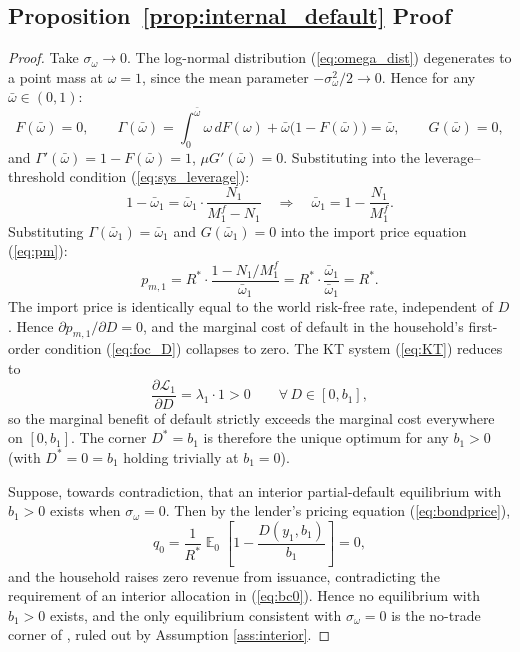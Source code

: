\documentclass[11pt]{article}
\DeclareMathOperator{\E}{\mathbb{E}}
\theoremstyle{definition}
\theoremstyle{plain}
\theoremstyle{remark}
\newcommand{\Mf}{M^{f}}
\newcommand{\Rstar}{R^{*}}
\begin{document}
\begin{appendices}
\section{Proposition~\ref{prop:internal_default} Proof} \label{ap:internal_default_proof}

\begin{proof}
Take $\sigma_\omega \to 0$. The log-normal distribution (\ref{eq:omega_dist}) degenerates to a point mass at $\omega = 1$, since the mean parameter $-\sigma_\omega^2/2 \to 0$. Hence for any $\bar\omega \in (0, 1)$:
\begin{equation*}
    F(\bar\omega) = 0, \qquad \Gamma(\bar\omega) = \int_0^{\bar\omega} \omega \, dF(\omega) + \bar\omega\bigl(1 - F(\bar\omega)\bigr) = \bar\omega, \qquad G(\bar\omega) = 0,
\end{equation*}
and $\Gamma'(\bar\omega) = 1 - F(\bar\omega) = 1$, $\mu G'(\bar\omega) = 0$. Substituting into the leverage--threshold condition (\ref{eq:sys_leverage}):
\begin{equation*}
    1 - \bar\omega_1 = \bar\omega_1 \cdot \frac{N_1}{\Mf_1 - N_1} \quad \Longrightarrow \quad \bar\omega_1 = 1 - \frac{N_1}{\Mf_1}.
\end{equation*}
Substituting $\Gamma(\bar\omega_1) = \bar\omega_1$ and $G(\bar\omega_1) = 0$ into the import price equation (\ref{eq:pm}):
\begin{equation*}
    p_{m,1} = \Rstar \cdot \frac{1 - N_1/\Mf_1}{\bar\omega_1} = \Rstar \cdot \frac{\bar\omega_1}{\bar\omega_1} = \Rstar.
\end{equation*}
The import price is identically equal to the world risk-free rate, independent of $D$. Hence $\partial p_{m,1}/\partial D = 0$, and the marginal cost of default in the household's first-order condition (\ref{eq:foc_D}) collapses to zero. The KT system (\ref{eq:KT}) reduces to
\begin{equation*}
    \frac{\partial \mathcal{L}_1}{\partial D} = \lambda_1 \cdot 1 > 0 \qquad \forall \, D \in [0, b_1],
\end{equation*}
so the marginal benefit of default strictly exceeds the marginal cost everywhere on $[0, b_1]$. The corner $D^* = b_1$ is therefore the unique optimum for any $b_1 > 0$ (with $D^* = 0 = b_1$ holding trivially at $b_1 = 0$).

Suppose, towards contradiction, that an interior partial-default equilibrium with $b_1 > 0$ exists when $\sigma_\omega = 0$. Then by the lender's pricing equation (\ref{eq:bondprice}),
\begin{equation*}
    q_0 = \frac{1}{\Rstar} \E_0\!\left[1 - \frac{D(y_1, b_1)}{b_1}\right] = 0,
\end{equation*}
and the household raises zero revenue from issuance, contradicting the requirement of an interior allocation in (\ref{eq:bc0}). Hence no equilibrium with $b_1 > 0$ exists, and the only equilibrium consistent with $\sigma_\omega = 0$ is the no-trade corner of \textcite{dubey_default_2005}, ruled out by Assumption \ref{ass:interior}.
\end{proof}

\end{appendices}
\end{document}
